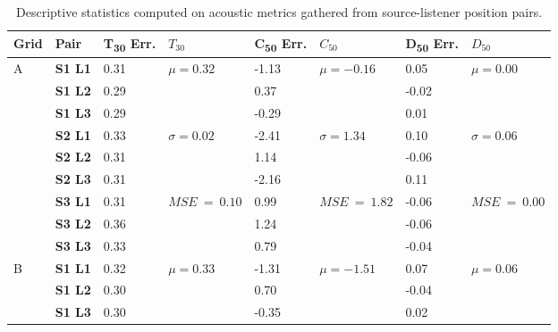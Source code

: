 \begin{table}[htb]
    \centering
    \caption[Ray tracing testing --- acoustic metrics descriptive statistics]{Descriptive statistics computed on acoustic metrics gathered from source-listener position pairs.}\label{tab:rt-metrics-stats}
    \begin{tabular}{@{}llllllll@{}}
    \toprule
    Grid & Pair & T\textsubscript{30} Err. & $T_{30}$ & C\textsubscript{50} Err. & $C_{50}$ & D\textsubscript{50} Err. &  $D_{50}$ \\ \midrule
        \multirow{9}{*}{A}  & \textbf{S1 L1} & 0.31  & \multirow{3}{*}{$\mu = 0.32$} & -1.13 & \multirow{3}{*}{$\mu = -0.16$} & 0.05  & \multirow{3}{*}{$\mu = 0.00$} \\
           & \textbf{S1 L2} & 0.29 &                       & 0.37  &                        & -0.02 &                       \\
           & \textbf{S1 L3} & 0.29 &                       & -0.29 &                        & 0.01  &                       \\
           & \textbf{S2 L1} & 0.33 & \multirow{3}{*}{$\sigma = 0.02$} & -2.41 & \multirow{3}{*}{$\sigma = 1.34$}  & 0.10  & \multirow{3}{*}{$\sigma = 0.06$} \\
           & \textbf{S2 L2} & 0.31 &                       & 1.14  &                        & -0.06 &                       \\
           & \textbf{S2 L3} & 0.31 &                       & -2.16 &                        & 0.11  &                       \\
           & \textbf{S3 L1} & 0.31 & \multirow{3}{*}{$\scriptstyle{MSE}~=~{0.10}$} & 0.99  & \multirow{3}{*}{$\scriptstyle{MSE}~=~1.82$}  & -0.06 & \multirow{3}{*}{$\scriptstyle{MSE}~=~0.00$} \\
           & \textbf{S3 L2} & 0.36 &                       & 1.24  &                        & -0.06 &                       \\
           & \textbf{S3 L3} & 0.33 &                       & 0.79  &                        & -0.04 &                       \\ \cmidrule(l){1-8}
        \multirow{9}{*}{B}& \textbf{S1 L1} & 0.32 & \multirow{3}{*}{$\mu = 0.33$} & -1.31 & \multirow{3}{*}{$\mu = -1.51$} & 0.07  & \multirow{3}{*}{$\mu = 0.06$} \\ 
           & \textbf{S1 L2} & 0.30 &                       & 0.70  &                        & -0.04 &                       \\
           & \textbf{S1 L3} & 0.30 &                       & -0.35 &                        & 0.02  &                       \\

\end{tabular}
\end{table}
